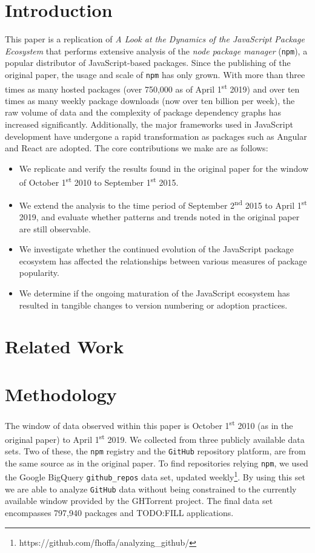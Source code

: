 \documentclass[10pt,conference]{IEEEtran}
\def\code#1{\texttt{#1}}
\begin{document}
\section{Introduction}
This paper is a replication of \emph{A Look at the Dynamics of the JavaScript Package Ecosystem}\cite{Wittern:2016} that performs extensive analysis of 
the \emph{node package manager} (\code{npm}), a popular distributor of JavaScript-based packages. Since the publishing of the original paper, the usage and scale of \code{npm} has only grown. With more than three times as many hosted packages (over 750,000 as of April 1\textsuperscript{st} 2019) 
and over ten times as many weekly package downloads (now over ten billion per week), the raw volume of data and the complexity of package dependency graphs has increased significantly. 
Additionally, the major frameworks used in JavaScript development have undergone a rapid transformation as packages such as Angular and React are adopted\footnotemark[\ref{adoption}].
The core contributions we make are as follows:
\begin{itemize}
  \item We replicate and verify the results found in the original paper for the window of October 1\textsuperscript{st} 2010 to September 1\textsuperscript{st} 2015.
  \item We extend the analysis to the time period of September 2\textsuperscript{nd} 2015 to April 1\textsuperscript{st} 2019, and evaluate whether patterns and trends noted in the original paper are still observable.
  \item We investigate whether the continued evolution of the JavaScript package ecosystem has affected the relationships between various measures of package popularity.
  \item We determine if the ongoing maturation of the JavaScript ecosystem has resulted in tangible changes to version numbering or adoption practices.
\end{itemize}

\section{Related Work}


\section{Methodology}
The window of data observed within this paper is October 1\textsuperscript{st} 2010 (as in the original paper) to April 1\textsuperscript{st} 2019.
We collected from three publicly available data sets. Two of these, the \code{npm} registry and the \code{GitHub} repository platform, are from the same source as in the original paper.
To find repositories relying \code{npm}, we used the Google BigQuery \code{github\_repos} data set, updated weekly\footnote{https://github.com/fhoffa/analyzing\_github/}.
By using this set we are able to analyze \code{GitHub} data without being constrained to the currently available window provided by the GHTorrent project\cite{ghtorrent}.
The final data set encompasses 797,940 packages and TODO:FILL applications.
\end{document}
